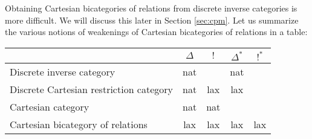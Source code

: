 Obtaining Cartesian bicategories of relations from discrete inverse categories is more difficult.  We will discuss this later in Section \ref{sec:cpm}.
Let us summarize the various notions of weakenings of Cartesian bicategories of relations in a table:


\hfil
\begin{tabular}{l|cccc}
                                                     & $\Delta$          & $!$             & $\Delta^*$         & $!^*$\\
\hline
Discrete inverse category            & nat &  & nat  & \\
Discrete Cartesian restriction category      & nat &  lax  & lax \\
Cartesian category                                      & nat & nat &   \\
Cartesian bicategory of relations & lax  & lax & lax & lax \\
\end{tabular}
